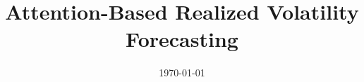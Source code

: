 \documentclass[12pt]{article}
\title{Attention-Based Realized Volatility Forecasting}
\author{}
\date{\today}
\begin{document}
\maketitle

\begin{abstract}

\end{abstract}













\end{document}

